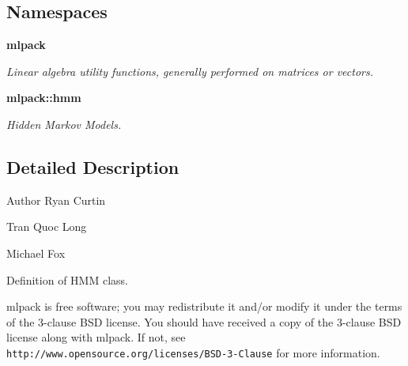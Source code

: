 \subsection*{Namespaces}
\begin{DoxyCompactItemize}
\item 
 \textbf{ mlpack}
\begin{DoxyCompactList}\small\item\em Linear algebra utility functions, generally performed on matrices or vectors. \end{DoxyCompactList}\item 
 \textbf{ mlpack\+::hmm}
\begin{DoxyCompactList}\small\item\em Hidden Markov Models. \end{DoxyCompactList}\end{DoxyCompactItemize}


\subsection{Detailed Description}
\begin{DoxyAuthor}{Author}
Ryan Curtin 

Tran Quoc Long 

Michael Fox
\end{DoxyAuthor}
Definition of H\+MM class.

mlpack is free software; you may redistribute it and/or modify it under the terms of the 3-\/clause B\+SD license. You should have received a copy of the 3-\/clause B\+SD license along with mlpack. If not, see {\tt http\+://www.\+opensource.\+org/licenses/\+B\+S\+D-\/3-\/\+Clause} for more information. 